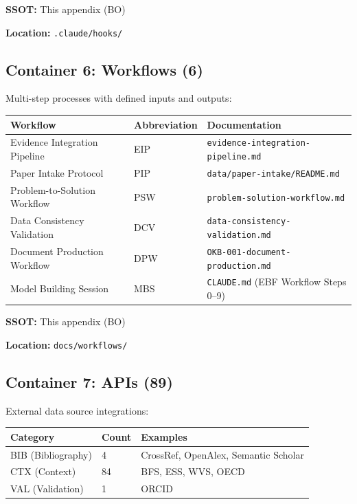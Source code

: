 \textbf{SSOT:} This appendix (BO)

\textbf{Location:} \texttt{.claude/hooks/}


\subsection{Container 6: Workflows (6)}
\label{sec:bo-workflows}

Multi-step processes with defined inputs and outputs:

\begin{center}
\begin{tabular}{|l|l|l|}
\hline
\textbf{Workflow} & \textbf{Abbreviation} & \textbf{Documentation} \\
\hline
Evidence Integration Pipeline & EIP & \texttt{evidence-integration-pipeline.md} \\
Paper Intake Protocol & PIP & \texttt{data/paper-intake/README.md} \\
Problem-to-Solution Workflow & PSW & \texttt{problem-solution-workflow.md} \\
Data Consistency Validation & DCV & \texttt{data-consistency-validation.md} \\
Document Production Workflow & DPW & \texttt{OKB-001-document-production.md} \\
Model Building Session & MBS & \texttt{CLAUDE.md} (EBF Workflow Steps 0--9) \\
\hline
\end{tabular}
\end{center}

\textbf{SSOT:} This appendix (BO)

\textbf{Location:} \texttt{docs/workflows/}


\subsection{Container 7: APIs (89)}
\label{sec:bo-apis}

External data source integrations:

\begin{center}
\begin{tabular}{|l|l|l|}
\hline
\textbf{Category} & \textbf{Count} & \textbf{Examples} \\
\hline
BIB (Bibliography) & 4 & CrossRef, OpenAlex, Semantic Scholar \\
CTX (Context) & 84 & BFS, ESS, WVS, OECD \\
VAL (Validation) & 1 & ORCID \\
\hline
\end{tabular}
\end{center}

